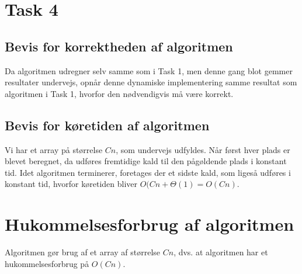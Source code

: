 \section{Task 4}
\subsection{Bevis for korrektheden af algoritmen}

Da algoritmen udregner selv samme som i Task 1, men denne gang blot gemmer resultater undervejs, opnår denne dynamiske implementering samme resultat som algoritmen i Task 1, hvorfor den nødvendigvis må være korrekt. 

\subsection{Bevis for køretiden af algoritmen}

Vi har et array på størrelse $Cn$, som undervejs udfyldes.
Når først hver plads er blevet beregnet, da udføres fremtidige kald til den pågøldende plads i konstant tid. Idet algoritmen terminerer, foretages der et sidste kald, som ligeså udføres i konstant tid, hvorfor køretiden bliver $O(Cn+\Theta(1) = O(Cn)$.

\section{Hukommelsesforbrug af algoritmen}
Algoritmen gør brug af et array af størrelse $Cn$, dvs.
at algoritmen har et hukommelsesforbrug på $O(Cn)$.


